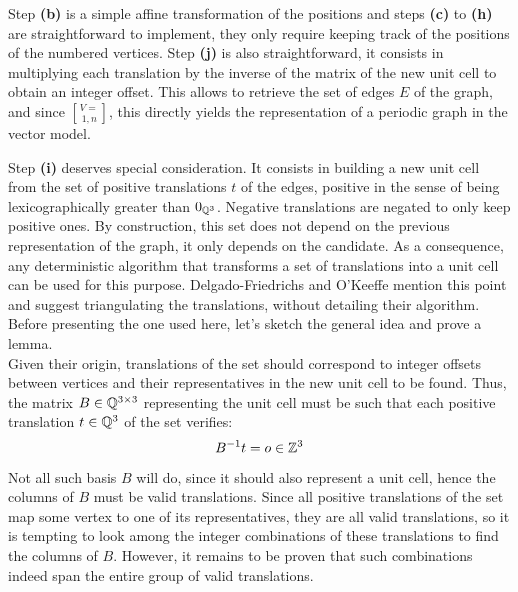 \documentclass[main.tex]{subfiles}
\begin{document}
Step {\sffamily\small\bfseries(b)} is a simple affine transformation of the positions and steps {\sffamily\small\bfseries(c)} to {\sffamily\small\bfseries(h)} are straightforward to implement, they only require keeping track of the positions of the numbered vertices. Step {\sffamily\small\bfseries(j)} is also straightforward, it consists in multiplying each translation by the inverse of the matrix of the new unit cell to obtain an integer offset. This allows to retrieve the set of edges $E$ of the graph, and since $V = \brack{1,n}$, this directly yields the representation of a periodic graph in the vector model.

\label{triangulate}

Step {\sffamily\small\bfseries(i)} deserves special consideration. It consists in building a new unit cell from the set of positive translations $t$ of the edges, positive in the sense of being lexicographically greater than $0_{\mathbb{Q}^3}$. Negative translations are negated to only keep positive ones. By construction, this set does not depend on the previous representation of the graph, it only depends on the candidate. As a consequence, any deterministic algorithm that transforms a set of translations into a unit cell can be used for this purpose. Delgado-Friedrichs and O'Keeffe \autocite{Systre} mention this point and suggest triangulating the translations, without detailing their algorithm. Before presenting the one used here, let's sketch the general idea and prove a lemma.\\

Given their origin, translations of the set should correspond to integer offsets between vertices and their representatives in the new unit cell to be found. Thus, the matrix $B\in\mathbb{Q}^{3\times3}$ representing the unit cell must be such that each positive translation $t\in\mathbb{Q}^3$ of the set verifies:
\begin{equation}
	B^{-1}t = o\in\mathbb{Z}^3
	\label{unitcellcondition}
\end{equation}
Not all such basis $B$ will do, since it should also represent a unit cell, hence the columns of $B$ must be valid translations. Since all positive translations of the set map some vertex to one of its representatives, they are all valid translations, so it is tempting to look among the integer combinations of these translations to find the columns of $B$. However, it remains to be proven that such combinations indeed span the entire group of valid translations.
\end{document}
